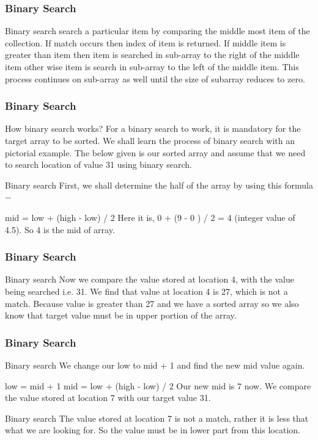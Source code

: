\documentclass{beamer}
\begin{document}
\begin{frame}
\frametitle{Binary Search}
\large
Binary search search a particular item by comparing the middle most item of the collection. If match occurs then index of item is returned. If middle item is greater than item then item is searched in sub-array to the right of the middle item other wise item is search in sub-array to the left of the middle item. This process continues on sub-array as well until the size of subarray reduces to zero.
\end{frame}

\begin{frame}
\frametitle{Binary Search}
\large
How binary search works?
For a binary search to work, it is mandatory for the target array to be sorted. We shall learn the process of binary search with an pictorial example. The below given is our sorted array and assume that we need to search location of value 31 using binary search.

Binary search
First, we shall determine the half of the array by using this formula −

mid = low + (high - low) / 2
Here it is, 0 + (9 - 0 ) / 2 = 4 (integer value of 4.5). So 4 is the mid of array.
\end{frame}
\begin{frame}
\frametitle{Binary Search}
\large
Binary search
Now we compare the value stored at location 4, with the value being searched i.e. 31. We find that value at location 4 is 27, which is not a match. Because value is greater than 27 and we have a sorted array so we also know that target value must be in upper portion of the array.
\end{frame}
\begin{frame}
\frametitle{Binary Search}
\large
Binary search
We change our low to mid + 1 and find the new mid value again.

low = mid + 1
mid = low + (high - low) / 2
Our new mid is 7 now. We compare the value stored at location 7 with our target value 31.

Binary search
The value stored at location 7 is not a match, rather it is less that what we are looking for. So the value must be in lower part from this location.
\end{frame}
\end{document}
